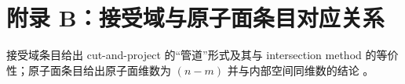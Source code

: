 \section{附录 B：接受域与原子面条目对应关系}

接受域条目给出 cut-and-project 的“管道”形式及其与 intersection method 的等价性；原子面条目给出原子面维数为 $(n-m)$ 并与内部空间同维数的结论 \cite{IUCRAcceptanceDomain,IUCRAtomicSurface}。

